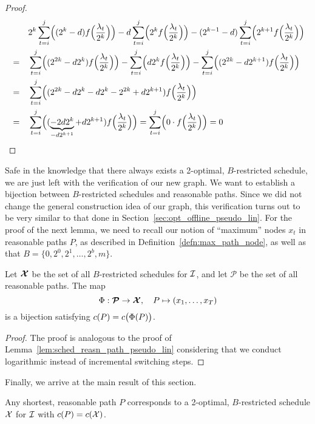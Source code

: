 \begin{proof}
\begin{align*}
	&&&2^k\sum\limits_{t=i}^j\Bigl((2^k-d)f\Bigl(\frac{\lambda_t}{2^k}\Bigr)\Bigr)-d\sum\limits_{t=i}^j\Bigl(2^kf\Bigl(\frac{\lambda_t}{2^k}\Bigr)\Bigr)-(2^{k-1}-d)\sum\limits_{t=i}^j\Bigl(2^{k+1}f\Bigl(\frac{\lambda_t}{2^k}\Bigr)\Bigr)\\
	&=&&\sum\limits_{t=i}^j\Bigl((2^{2k}-d2^k)f\Bigl(\frac{\lambda_t}{2^k}\Bigr)\Bigr)-\sum\limits_{t=i}^j\Bigl(d2^kf\Bigl(\frac{\lambda_t}{2^k}\Bigr)\Bigr)-\sum\limits_{t=i}^j\Bigl((2^{2k}-d2^{k+1})f\Bigl(\frac{\lambda_t}{2^k}\Bigr)\Bigr)\\
	&=&&\sum\limits_{t=i}^j\Bigl((2^{2k}-d2^k-d2^k-2^{2k}+d2^{k+1})f\Bigl(\frac{\lambda_t}{2^k}\Bigr)\Bigr)\\
	&=&&\sum\limits_{t=i}^j\Bigl((\underbrace{-2d2^k}_{-d2^{k+1}}+d2^{k+1})f\Bigl(\frac{\lambda_t}{2^k}\Bigr)\Bigr)=\sum\limits_{t=i}^j\Bigl(0\cdot f\Bigl(\frac{\lambda_t}{2^k}\Bigr)\Bigr)=0
\end{align*}	
\end{proof}
Safe in the knowledge that there always exists a 2-optimal, $B$-restricted schedule, we are just left with the verification of our new graph. We want to establish a bijection between $B$-restricted schedules and reasonable paths. Since we did not change the general construction idea of our graph, this verification turns out to be very similar to that done in Section~\ref{sec:opt_offline_pseudo_lin}. For the proof of the next lemma, we need to recall our notion of ``maximum'' nodes $x_t$ in reasonable paths $P$, as described in Definition~\ref{defn:max_path_node}, as well as that $B=\{0,2^0,2^1,\dotsc,2^b,m\}$.
\begin{lem}\label{lem:sched_reasn_path_approx_2}
Let $\bm{\mathcal{X}}$ be the set of all $B$-restricted schedules for $\mathcal{I}$, and let $\bm{\mathcal{P}}$ be the set of all reasonable paths. The map
\begin{equation*}
	\Phi:\bm{\mathcal{P}}\rightarrow\bm{\mathcal{X}},\quad P\mapsto (x_1,\dotsc,x_T)
\end{equation*}
is a bijection satisfying $c(P)=c\bigl(\Phi(P)\bigr)$.
\end{lem}
\begin{proof}
The proof is analogous to the proof of Lemma~\ref{lem:sched_reasn_path_pseudo_lin} considering that we conduct logarithmic instead of incremental switching steps.
\end{proof}
Finally, we arrive at the main result of this section.
\begin{thm}\label{thm:approx_2}
Any shortest, reasonable path $P$ corresponds to a 2-optimal, $B$-restricted schedule $\mathcal{X}$ for $\mathcal{I}$ with $c(P)=c(\mathcal{X})$.
\end{thm} 
